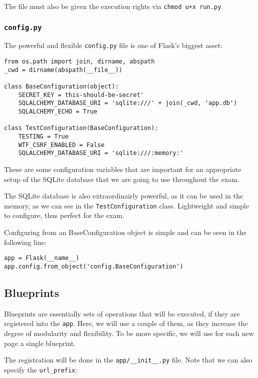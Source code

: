 \documentclass[../main/main.tex]{subfiles}
\begin{document}
The file must also be given the execution rights via \lstinline|chmod u+x run.py|. 

\subsubsection{\lstinline|config.py|}
\label{sec:config.py}
The powerful and flexible \lstinline|config.py| file is one of Flask's
biggest asset:

\begin{lstlisting}[caption=config.py, label=lst:config.py]
from os.path import join, dirname, abspath
_cwd = dirname(abspath(__file__))

class BaseConfiguration(object):
    SECRET_KEY = this-should-be-secret'
    SQLALCHEMY_DATABASE_URI = 'sqlite:///' + join(_cwd, 'app.db')
    SQLALCHEMY_ECHO = True

class TestConfiguration(BaseConfiguration):
    TESTING = True
    WTF_CSRF_ENABLED = False
    SQLALCHEMY_DATABASE_URI = 'sqlite:///:memory:'
\end{lstlisting}

These are some configuration variables that are important for an
appropriate setup of the SQLite database that we are going to use
throughout the exam. 

The SQLite database is also extraordinairly powerful, as it can be
used in the memory, as we can see in the \lstinline|TestConfiguration|
class. Lightweight and simple to configure, thus perfect for the exam.

Configuring from an BaseConfiguration object is simple and can be seen in the
following line:

\begin{lstlisting}
app = Flask(__name__)
app.config.from_object('config.BaseConfiguration')
\end{lstlisting}

\subsection{Blueprints}

Blueprints are essentially sets of operations that will be executed,
if they are registered into the \lstinline|app|. Here, we will use a
couple of them, as they increase the degree of modularity and
flexibility. To be more specific, we will use for each new page a
single blueprint. 

The registration will be done in the \lstinline|app/__init__.py|
file. Note that we can also specify the \lstinline|url_prefix|: 
\end{document}
